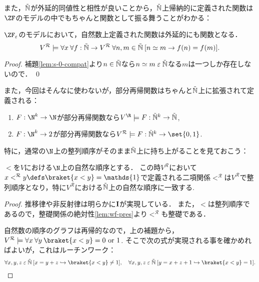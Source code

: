 \documentclass[realisability.tex]{subfiles}
\begin{document}
また，$\NN$が外延的同値性と相性が良いことから，$\NN$上帰納的に定義された関数は$\ZF$のモデルの中でもちゃんと関数として振る舞うことがわかる：

\begin{lemma}\label{lem:nat-func-strong}
 $\ZF_{\varepsilon}$のモデルにおいて，自然数上定義された関数は外延的にも関数となる．
 \[
 V^{\mathcal{R}} \models \forall x \: \forall f : \mathord{\tilde{\mathbb{N}}} \to V^{\mathcal{R}}\:
 \forall n, m \in \mathord{\tilde{\mathbb{N}}} \: [n \simeq m \to f(n) = f(m)].
 \]
\end{lemma}
\begin{proof}
 補題\ref{lem:s-0-compat}より$n \in \mathord{\tilde{\mathbb{N}}}$なら$n \simeq m \mathrel{\varepsilon} \mathord{\tilde{\mathbb{N}}}$なる$m$は一つしか存在しないので． \qed
\end{proof}

また，今回はそんなに使わないが，部分再帰関数はちゃんと$\NN$上に拡張されて定義される：
\begin{lemma}\label{lem:recursives-defined}
 \begin{enumerate}
  \item $F: \N^k \to \N$が部分再帰関数なら$V^{\R} \models F: \NN^k \to \NN$,
  \item $F: \N^k \to 2$が部分再帰関数なら$V^{\mathcal{R}} \models F: \NN^k \to \set{0, 1}$.
 \end{enumerate}
\end{lemma}

特に，通常の$\N$上の整列順序がそのまま$\NN$上に持ち上がることを見ておこう：

\begin{lemma}[$\NN$における自然な順序]\label{lem:nat-ord-in-NN}
 ${<}$を$V$における$\N$上の自然な順序とする．
 この時$V^{\mathcal{R}}$において$x <^{\mathcal{R}} y \defs \braket{x < y} = \mathds{1}$で定義される二項関係$<^{\mathcal{R}}$は$V^{\mathcal{R}}$で整列順序となり，特に$V^{\mathcal{R}}$における$\NN$上の自然な順序に一致する.
\end{lemma}
\begin{proof}
 推移律や非反射律は明らかに$\mathsf{\mathbf{I}}$が実現している．
 また，$<$は整列順序であるので，整礎関係の絶対性\ref{lem:wf-pres}より$<^\mathcal{R}$も整礎である．

 自然数の順序のグラフは再帰的なので，上の補題から，$V^{\mathcal{R}} \models \forall x\: \forall y\: \braket{x < y} = 0 \text{ or } 1$.
 そこで次の式が実現される事を確かめればよいが，これはルーチンワーク：
 \[
  \forall x, y, z \strin \NN\: [x = y + z \hookrightarrow \braket{x < y} \neq 1],\quad
  \forall x, y, z \strin \NN\: [y = x + z + 1 \hookrightarrow \braket{x < y} = 1].
 \]
\end{proof}
\end{document}
